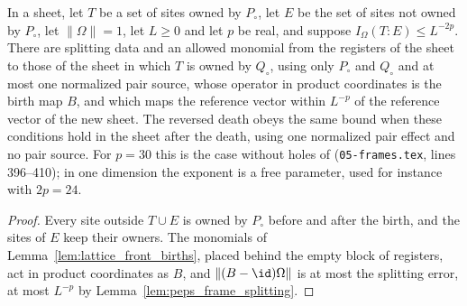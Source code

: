 \begin{lemma}
    \label{thm:lattice_sheet_birth_bounded}
    \leanok
    In a sheet, let $T$ be a set of sites owned by $P_\circ$, let $E$ be the set
    of sites not owned by $P_\circ$, let $\lVert\Omega\rVert=1$, let $L\ge0$ and
    let $p$ be real, and suppose $I_\Omega(T:E)\le L^{-2p}$. There are splitting data and an allowed
    monomial from the registers of the sheet to those of the sheet in which $T$
    is owned by $Q_\circ$, using only $P_\circ$ and $Q_\circ$ and at most one
    normalized pair source, whose operator in product coordinates is the birth
    map $B$, and which maps the reference vector within $L^{-p}$ of the
    reference vector of the new sheet. The reversed death obeys the same bound
    when these conditions hold in the sheet after the death, using one
    normalized pair effect and no pair source. For $p=30$ this is the case
    without holes of \cite[Lemma~6.5]{OpenAI2026PolynomialPEPS}
    (\texttt{05-frames.tex}, lines 396--410); in one dimension the exponent is
    a free parameter, used for instance with $2p=24$.
\end{lemma}

\begin{proof}\leanok
    Every site outside $T\cup E$ is owned by $P_\circ$ before and after the
    birth, and the sites of $E$ keep their owners. The monomials of
    Lemma~\ref{lem:lattice_front_births}, placed behind the
    empty block of registers, act in product coordinates as $B$, and
    $\lVert(B-\id)\Omega\rVert$ is at most the splitting error, at most
    $L^{-p}$ by Lemma~\ref{lem:peps_frame_splitting}.
\end{proof}

